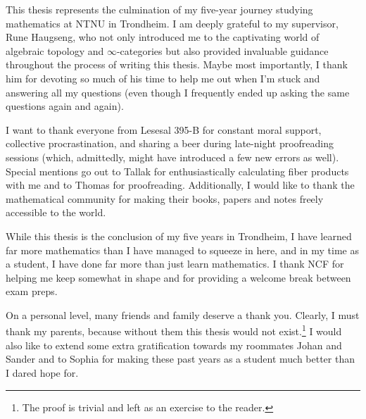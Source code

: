 \documentclass[../../thesis.tex]{subfiles}
\begin{document}
This thesis represents the culmination of my five-year journey studying mathematics at NTNU in Trondheim. I am deeply grateful to my supervisor, Rune Haugseng, who not only introduced me to the captivating world of algebraic topology and $\infty$-categories but also provided invaluable guidance throughout the process of writing this thesis.
Maybe most importantly, I thank him for devoting so much of his time to help me out when I'm stuck and answering all my questions (even though I frequently ended up asking the same questions again and again).


I want to thank everyone from Lesesal 395-B for constant moral support, collective procrastination, and sharing a beer during late-night proofreading sessions (which, admittedly, might have introduced a few new errors as well).
Special mentions go out to Tallak for enthusiastically calculating fiber products with me and to Thomas for proofreading.
Additionally, I would like to thank the mathematical community for making their books, papers and notes freely accessible to the world.


While this thesis is the conclusion of my five years in Trondheim, I have learned far more mathematics than I have managed to squeeze in here, and in my time as a student, I have done far more than just learn mathematics.
I thank NCF for helping me keep somewhat in shape and for providing a welcome break between exam preps.


On a personal level, many friends and family deserve a thank you.
Clearly, I must thank my parents, because without them this thesis would not exist.\footnote{The proof is trivial and left as an exercise to the reader.}
I would also like to extend some extra gratification towards my roommates Johan and Sander and to Sophia for making these past years as a student much better than I dared hope for.
\end{document}
